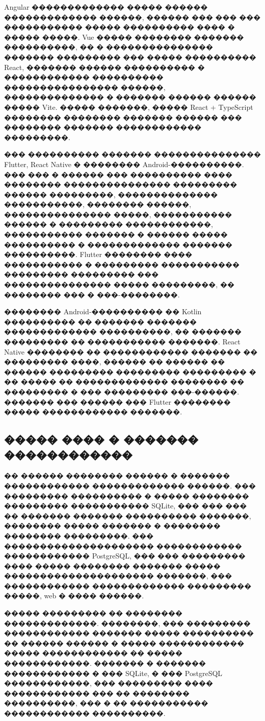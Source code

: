 Angular ������������� ����� ������ ������������� ������, ������ ��� ��� ��� ����������� ����� ���������� ���� � ����� �����. Vue ����� �������� ������� ����������, �� � ��������������� ������� ��������� ��� ����� ���������� React, ������� ������ ���������� � ������������ ���������� ���������������� ������, �������������� � ������� ������ ������ ����� Vite. ����� �������, ����� React + TypeScript �������� �������� ������� ������ ��� �������� ������� ������������ ���������.

��� ���������� ������� ��������������� Flutter, React Native � �������� Android-����������. ��� ��� � ������ ��� ���������� ���� �������� ��������������� ��������� ������ ���������, �������������� �����������, �������� ������, ��������������� �����, ����������� ������ � ��������� ������������, ����������� ������� � ������ ����� ���������� � ������������� ������� ����������. Flutter �������� ���� ����������� � ��������� ����������� ��������� ��������� ��� ��������������� ����� ���������, �� �������� ��� � ���-��������\cite{flutter_docs}.

�������� Android-���������� �� Kotlin ���������� �� ������� ������� ������������� ����������, �� ������� ��������� �� ����������� �������. React Native �������� �� ������������ ������� �� ��������� ����, ������ �� ������ �� ������ ��������� ��������� ��������� � �� ����� �� ������������� �������� �� ��������� � ��� ��������� ���-������. ������� ��� ������ ��� Flutter �������� ����� ������������ �������.

\subsection{����� ���� � ������� ������������}

�� ������ �������� ������ � ������� ������������ ������������� ������. ��� ��������� ���������� � ����� �������� ��������� ����������� SQLite, ��� ��� ��� �� ������� ������� ���������� �������, �������� ����� ������� � �������� �������� ���������. ��� ��������������������� ������������ ������������ PostgreSQL, ��� ��� ��������� ���� ����� �������� ������� ����� ��������������������� �������, ��� ������������ ������������� ��������� �����, web � ���� ������\cite{sqlite_docs,postgresql_docs}.

����� ��������� �� �������� �������������. ��������, ��� ��������� ������������ ������� ����� ���������� �� ������ ������ � ����� ������������ ����� ������������ �� ����� ������������. ������� � ������� ������������ � ��� SQLite, � ��� PostgreSQL ������������, ��� ��������� ���� ������������ ��� �� �������� ����������, ��� � �� ����������� ������������ ����������.

